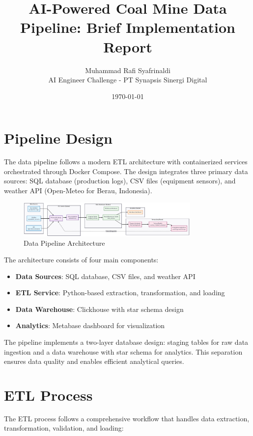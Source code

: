 \documentclass[11pt]{article}
\title{AI-Powered Coal Mine Data Pipeline: Brief Implementation Report}
\author{Muhammad Rafi Syafrinaldi \\ AI Engineer Challenge - PT Synapsis Sinergi Digital}
\date{\today}
\begin{document}
\maketitle

\section{Pipeline Design}

The data pipeline follows a modern ETL architecture with containerized services orchestrated through Docker Compose. The design integrates three primary data sources: SQL database (production logs), CSV files (equipment sensors), and weather API (Open-Meteo for Berau, Indonesia).

\begin{figure}[H]
\centering
\includegraphics[width=0.8\textwidth]{assets/pipeline_architecture.png}
\caption{Data Pipeline Architecture}
\label{fig:architecture}
\end{figure}

The architecture consists of four main components:
\begin{itemize}
    \item \textbf{Data Sources}: SQL database, CSV files, and weather API
    \item \textbf{ETL Service}: Python-based extraction, transformation, and loading
    \item \textbf{Data Warehouse}: Clickhouse with star schema design
    \item \textbf{Analytics}: Metabase dashboard for visualization
\end{itemize}

The pipeline implements a two-layer database design: staging tables for raw data ingestion and a data warehouse with star schema for analytics. This separation ensures data quality and enables efficient analytical queries.

\section{ETL Process}

The ETL process follows a comprehensive workflow that handles data extraction, transformation, validation, and loading:
\end{document}
